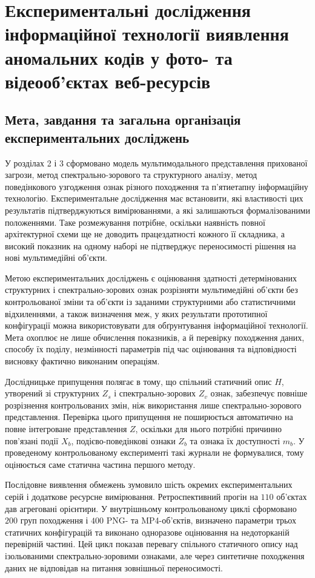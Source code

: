 \chapter{Експериментальні дослідження інформаційної технології виявлення аномальних кодів у фото- та відеооб’єктах веб-ресурсів}
\label{chap:experiments}

\section{Мета, завдання та загальна організація експериментальних досліджень}

У розділах 2 і 3 сформовано модель мультимодального представлення прихованої загрози, метод спектрально-зорового та структурного аналізу, метод поведінкового узгодження ознак різного походження та п’ятиетапну інформаційну технологію. Експериментальне дослідження має встановити, які властивості цих результатів підтверджуються вимірюваннями, а які залишаються формалізованими положеннями. Таке розмежування потрібне, оскільки наявність повної архітектурної схеми ще не доводить працездатності кожного її складника, а високий показник на одному наборі не підтверджує переносимості рішення на нові мультимедійні об’єкти.

Метою експериментальних досліджень є оцінювання здатності детермінованих структурних і спектрально-зорових ознак розрізняти мультимедійні об’єкти без контрольованої зміни та об’єкти із заданими структурними або статистичними відхиленнями, а також визначення меж, у яких результати прототипної конфігурації можна використовувати для обґрунтування інформаційної технології. Мета охоплює не лише обчислення показників, а й перевірку походження даних, способу їх поділу, незмінності параметрів під час оцінювання та відповідності висновку фактично виконаним операціям.

Дослідницьке припущення полягає в тому, що спільний статичний опис $H$, утворений зі структурних $Z_s$ і спектрально-зорових $Z_v$ ознак, забезпечує повніше розрізнення контрольованих змін, ніж використання лише спектрально-зорового представлення. Перевірка цього припущення не поширюється автоматично на повне інтегроване представлення $Z$, оскільки для нього потрібні причинно пов’язані події $X_b$, подієво-поведінкові ознаки $Z_b$ та ознака їх доступності $m_b$. У проведеному контрольованому експерименті такі журнали не формувалися, тому оцінюється саме статична частина першого методу.

Послідовне виявлення обмежень зумовило шість окремих експериментальних серій і додаткове ресурсне вимірювання. Ретроспективний прогін на $110$ об’єктах дав агреговані орієнтири. У внутрішньому контрольованому циклі сформовано $200$ груп походження і $400$ PNG- та MP4-об’єктів, визначено параметри трьох статичних конфігурацій та виконано одноразове оцінювання на недоторканій перевірній частині. Цей цикл показав перевагу спільного статичного опису над ізольованими спектрально-зоровими ознаками, але через синтетичне походження даних не відповідав на питання зовнішньої переносимості.


